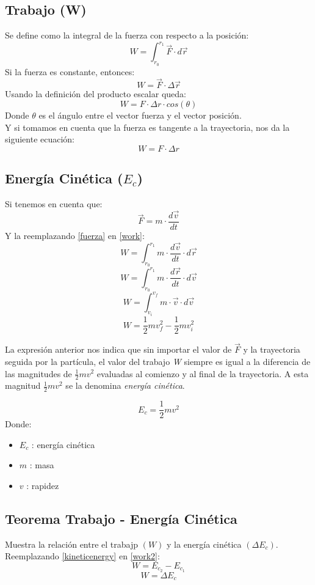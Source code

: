 \documentclass[../main.tex]{subfiles}
\begin{document}
\subsection{Trabajo (W)}
Se define como la integral de la fuerza con respecto a la posición:
\begin{equation} \label{work}
    W = \int_{r_0}^{r_1} \vec{F} \cdot d \vec{r} 
\end{equation}
Si la fuerza es constante, entonces:
\[ W = \vec{F} \cdot \Delta \vec{r} \]
Usando la definición del producto escalar queda:
\[ W = F \cdot \Delta r \cdot cos(\theta)\]
Donde $\theta$ es el ángulo entre el vector fuerza y el vector posición.\\
Y si tomamos en cuenta que la fuerza es tangente a la trayectoria,
nos da la siguiente ecuación:
\begin{equation} \label{work1}
    W = F \cdot \Delta r 
\end{equation}

\subsection{Energía Cinética ($E_c$)}
Si tenemos en cuenta que:
\begin{equation} \label{fuerza}
    \vec{F} = m \cdot \frac{d \vec{v}}{dt}
\end{equation}
Y la reemplazando \ref{fuerza} en \ref{work}:
\[ W = \int_{r_0}^{r_1} m \cdot \frac{d \vec{v}}{dt} \cdot d \vec{r} \]
\[ W = \int_{r_0}^{r_1} m \cdot \frac{d \vec{r}}{dt} \cdot d \vec{v} \]
\[ W = \int_{v_i}^{v_f} m \cdot \vec{v} \cdot d \vec{v} \]
\begin{equation} \label{work2}
    W = \frac{1}{2}mv_f^2 - \frac{1}{2}mv_i^2 
\end{equation}

La expresión anterior nos indica que sin importar el valor de \(\vec{F}\) y la 
trayectoria seguida por la partícula, el valor del trabajo \textit{W}
siempre es igual a la diferencia de las magnitudes de 
\(\frac{1}{2}mv^2\) evaluadas al comienzo y al final de la
 trayectoria. A esta magnitud \(\frac{1}{2}mv^2 \) se la denomina
\textit{energía cinética}.

\begin{equation} \label{kineticenergy}
    E_c = \frac{1}{2}mv^2 
\end{equation}
Donde:
\begin{itemize}
    \item $E_c$ : energía cinética
    \item $m$ : masa
    \item $v$ : rapidez
\end{itemize}

\subsection{Teorema Trabajo - Energía Cinética}
Muestra la relación entre el trabajp $(W)$ y la energía cinética $(\Delta E_c)$.\\
Reemplazando \ref{kineticenergy} en \ref{work2}:
\[W = E_{c_2} - E_{c_1} \]
\begin{equation} \label{work3}
    W = \Delta E_c
\end{equation}
\end{document}
